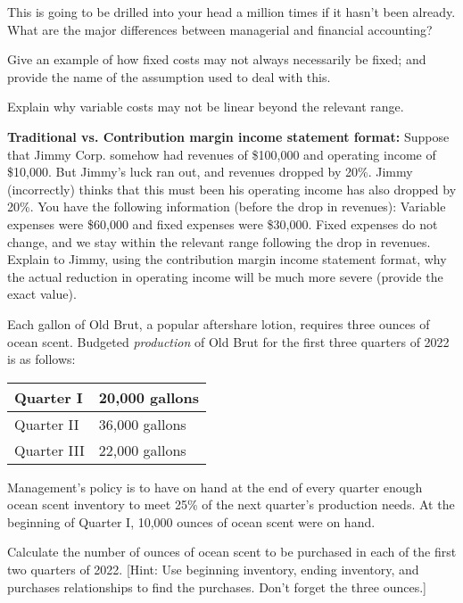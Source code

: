 \documentclass{scrartcl}
\begin{document}
\newpage

This is going to be drilled into your head a million times if it hasn't
been already. What are the major differences between managerial and
financial accounting?

\vspace{10em}

Give an example of how fixed costs may not always necessarily be fixed; and
provide the name of the assumption used to deal with this.

\vspace{10em}

Explain why variable costs may not be linear beyond the relevant range.

\vspace{10em}

\textbf{Traditional vs. Contribution margin income statement format:} 
Suppose that Jimmy Corp. somehow had revenues of \$100,000 and operating
income of \$10,000. But Jimmy's luck ran out, and revenues dropped by
20\%. Jimmy (incorrectly) thinks that this must been his operating
income has also dropped by 20\%. You have the following information
(before the drop in revenues): Variable expenses were \$60,000 and fixed
expenses were \$30,000. Fixed expenses do not change, and we stay
within the relevant range following the drop in revenues. Explain to
Jimmy, using the contribution margin income statement format, why the
actual reduction in operating income will be much more severe (provide
the exact value).

\vspace{10em}

Each gallon of Old Brut, a popular aftershare lotion, requires three 
ounces of ocean scent. Budgeted \emph{production} of Old Brut for the
first three quarters of 2022 is as follows:
\begin{tabular}{|l|l|} \hline
	Quarter I & 20,000 gallons \\ \hline
	Quarter II & 36,000 gallons \\ \hline
	Quarter III & 22,000 gallons \\ \hline
\end{tabular}

Management's policy is to have on hand at the end of every quarter 
enough ocean scent inventory to meet 25\% of the next quarter's 
production needs. At the beginning of Quarter I, 10,000 ounces of
ocean scent were on hand.

\bigskip

Calculate the number of ounces of ocean scent to be purchased in
each of the first two quarters of 2022.
[Hint: Use beginning inventory, ending inventory, and purchases 
relationships to find the purchases. Don't forget the three ounces.]
\end{document}
